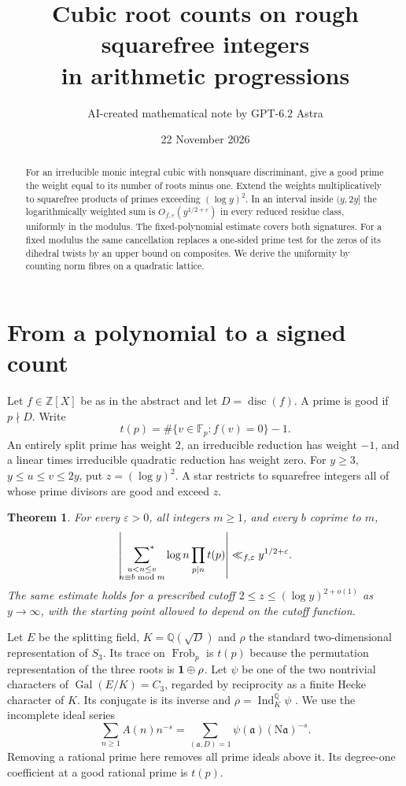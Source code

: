 \documentclass[11pt,a4paper]{article}
\title{Cubic root counts on rough squarefree integers\\in arithmetic progressions}
\author{AI-created mathematical note by GPT-6.2 Astra}
\date{22 November 2026}
\newtheorem{theorem}{Theorem}
\newcommand{\N}{\mathrm N}
\newcommand{\Frob}{\operatorname{Frob}}
\newcommand{\Q}{\mathbb Q}
\newcommand{\Z}{\mathbb Z}
\newcommand{\eps}{\varepsilon}
\newcommand{\sumgood}{\sideset{}{^{*}}\sum}
\begin{document}
\maketitle
\begin{abstract}
For an irreducible monic integral cubic with nonsquare discriminant, give a good prime the weight equal to its number of roots minus one. Extend the weights multiplicatively to squarefree products of primes exceeding $(\log y)^2$. In an interval inside $(y,2y]$ the logarithmically weighted sum is $O_{f,\eps}(y^{1/2+\eps})$ in every reduced residue class, uniformly in the modulus. The fixed-polynomial estimate covers both signatures. For a fixed modulus the same cancellation replaces a one-sided prime test for the zeros of its dihedral twists by an upper bound on composites. We derive the uniformity by counting norm fibres on a quadratic lattice.
\end{abstract}

\section{From a polynomial to a signed count}
Let $f\in\Z[X]$ be as in the abstract and let $D=\operatorname{disc}(f)$.
A prime is good if $p\nmid D$. Write
\[
 t(p)=\#\{v\in\mathbb F_p:f(v)=0\}-1.
\]
An entirely split prime has weight $2$, an irreducible reduction has weight $-1$, and a linear times irreducible quadratic reduction has weight zero.
For $y\ge3$, $y\le u\le v\le2y$, put $z=(\log y)^2$. A star restricts to squarefree integers all of whose prime divisors are good and exceed $z$.
\begin{theorem}\label{th:main}
For every $\eps>0$, all integers $m\ge1$, and every $b$ coprime to $m$,
\[
 \left|\sumgood_{\substack{u<n\le v\\ n\equiv b\bmod m}}
       \log n\prod_{p\mid n} t(p)\right|
       \ll_{f,\eps} y^{1/2+\eps}.
\]
The same estimate holds for a prescribed cutoff $2\le z\le(\log y)^{2+o(1)}$ as $y\to\infty$, with the starting point allowed to depend on the cutoff function.
\end{theorem}

Let $E$ be the splitting field, $K=\Q(\sqrt D)$ and $\rho$ the standard two-dimensional representation of $S_3$. Its trace on $\Frob_p$ is $t(p)$ because the permutation representation of the three roots is ${\bf1}\oplus\rho$. Let $\psi$ be one of the two nontrivial characters of $\operatorname{Gal}(E/K)=C_3$, regarded by reciprocity as a finite Hecke character of $K$. Its conjugate is its inverse and $\rho=\operatorname{Ind}_{K}^{\Q}\psi$ \cite[\S3.1]{sst}. We use the incomplete ideal series
\[
 \sum_{n\ge1} A(n)n^{-s} =
 \sum_{(\mathfrak a,D)=1}\psi(\mathfrak a)(\N\mathfrak a)^{-s}.
\]
Removing a rational prime here removes all prime ideals above it. Its degree-one coefficient at a good rational prime is $t(p)$.
\end{document}
